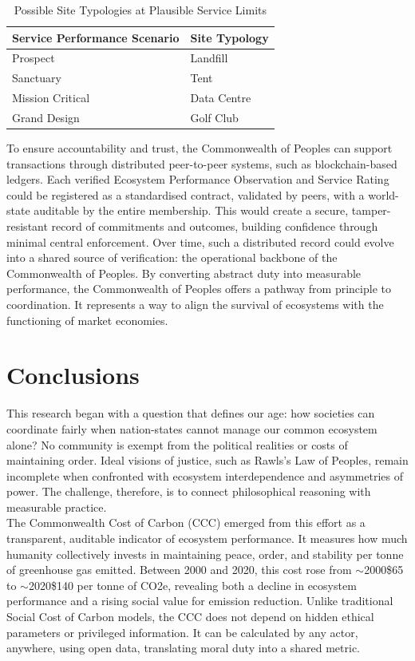 \documentclass[12pt, oneside]{article}   	%
\begin{document}
\begin{table}[H]
\caption{Possible Site Typologies at Plausible Service Limits}
\begin{center}
\begin{tabular}{| l | l |}
\hline
Service Performance Scenario&Site Typology\\
\hline
Prospect&Landfill\\
Sanctuary&Tent\\
Mission Critical&Data Centre\\
Grand Design&Golf Club\\
\hline
\end{tabular}
\end{center}
\label{Service limits table}
\end{table}

To ensure accountability and trust, the Commonwealth of Peoples can support transactions through distributed peer-to-peer systems, such as blockchain-based ledgers.
Each verified Ecosystem Performance Observation and Service Rating could be registered as a standardised contract, validated by peers, with a world-state auditable by the entire membership.
This would create a secure, tamper-resistant record of commitments and outcomes, building confidence through minimal central enforcement.
Over time, such a distributed record could evolve into a shared source of verification: the operational backbone of the Commonwealth of Peoples.
By converting abstract duty into measurable performance, the Commonwealth of Peoples offers a pathway from principle to coordination.
It represents a way to align the survival of ecosystems with the functioning of market economies.\\

\section{Conclusions}

This research began with a question that defines our age: how societies can coordinate fairly when nation-states cannot manage our common ecosystem alone?
No community is exempt from the political realities or costs of maintaining order.
Ideal visions of justice, such as Rawls’s Law of Peoples, remain incomplete when confronted with ecosystem interdependence and asymmetries of power.
The challenge, therefore, is to connect philosophical reasoning with measurable practice.\\

The Commonwealth Cost of Carbon (CCC) emerged from this effort as a transparent, auditable indicator of ecosystem performance.
It measures how much humanity collectively invests in maintaining peace, order, and stability per tonne of greenhouse gas emitted.
Between 2000 and 2020, this cost rose from $\sim$2000\$65 to $\sim$2020\$140 per tonne of CO2e, revealing both a decline in ecosystem performance and a rising social value for emission reduction.
Unlike traditional Social Cost of Carbon models, the CCC does not depend on hidden ethical parameters or privileged information.
It can be calculated by any actor, anywhere, using open data, translating moral duty into a shared metric.\\
\end{document}
